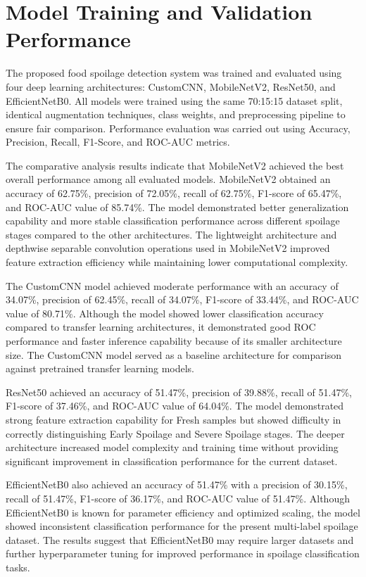 \section[Model Training and Validation Performance]{\textbf{Model Training and Validation Performance}}
The proposed food spoilage detection system was trained and evaluated using four deep learning architectures: CustomCNN, MobileNetV2, ResNet50, and EfficientNetB0. All models were trained using the same 70:15:15 dataset split, identical augmentation techniques, class weights, and preprocessing pipeline to ensure fair comparison. Performance evaluation was carried out using Accuracy, Precision, Recall, F1-Score, and ROC-AUC metrics.

The comparative analysis results indicate that MobileNetV2 achieved the best overall performance among all evaluated models. MobileNetV2 obtained an accuracy of 62.75\%, precision of 72.05\%, recall of 62.75\%, F1-score of 65.47\%, and ROC-AUC value of 85.74\%. The model demonstrated better generalization capability and more stable classification performance across different spoilage stages compared to the other architectures. The lightweight architecture and depthwise separable convolution operations used in MobileNetV2 improved feature extraction efficiency while maintaining lower computational complexity.

The CustomCNN model achieved moderate performance with an accuracy of 34.07\%, precision of 62.45\%, recall of 34.07\%, F1-score of 33.44\%, and ROC-AUC value of 80.71\%. Although the model showed lower classification accuracy compared to transfer learning architectures, it demonstrated good ROC performance and faster inference capability because of its smaller architecture size. The CustomCNN model served as a baseline architecture for comparison against pretrained transfer learning models.

ResNet50 achieved an accuracy of 51.47\%, precision of 39.88\%, recall of 51.47\%, F1-score of 37.46\%, and ROC-AUC value of 64.04\%. The model demonstrated strong feature extraction capability for Fresh samples but showed difficulty in correctly distinguishing Early Spoilage and Severe Spoilage stages. The deeper architecture increased model complexity and training time without providing significant improvement in classification performance for the current dataset.

EfficientNetB0 also achieved an accuracy of 51.47\% with a precision of 30.15\%, recall of 51.47\%, F1-score of 36.17\%, and ROC-AUC value of 51.47\%. Although EfficientNetB0 is known for parameter efficiency and optimized scaling, the model showed inconsistent classification performance for the present multi-label spoilage dataset. The results suggest that EfficientNetB0 may require larger datasets and further hyperparameter tuning for improved performance in spoilage classification tasks.

